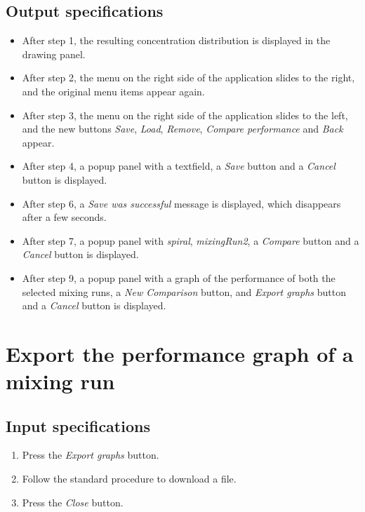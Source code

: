 \subsection*{Output specifications}
\begin{itemize}
\item After step 1, the resulting concentration distribution is displayed in the drawing panel.
\item After step 2, the menu on the right side of the application slides to the right, and the original menu items appear again.
\item After step 3, the menu on the right side of the application slides to the left, and the new buttons \emph{Save}, \emph{Load}, \emph{Remove}, \emph{Compare performance} and \emph{Back} appear.
\item After step 4, a popup panel with a textfield, a \emph{Save} button and a \emph{Cancel} button is displayed.
\item After step 6, a \emph{Save was successful} message is displayed, which disappears after a few seconds.
\item After step 7, a popup panel with \emph{spiral}, \emph{mixingRun2}, a \emph{Compare} button and a \emph{Cancel} button is displayed.
\item After step 9, a popup panel with a graph of the performance of both the selected mixing runs, a \emph{New Comparison} button, and \emph{Export graphs} button and a \emph{Cancel} button is displayed.
\end{itemize}

\section{Export the performance graph of a mixing run}

\subsection*{Input specifications}
\begin{enumerate}
\item Press the \emph{Export graphs} button.
\item Follow the standard procedure to download a file.
\item Press the \emph{Close} button.
\end{enumerate}

